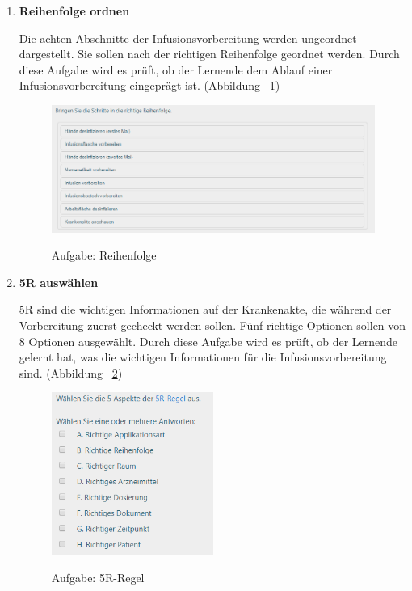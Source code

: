 \begin{enumerate}
    \item \textbf{Reihenfolge ordnen}
    
    Die achten Abschnitte der Infusionsvorbereitung werden ungeordnet dargestellt. Sie sollen nach der richtigen Reihenfolge geordnet werden. Durch diese Aufgabe wird es prüft, ob der Lernende dem Ablauf einer Infusionsvorbereitung eingeprägt ist. (Abbildung ~\ref{fig:Aufgabe1})
    
\begin{figure}[ht]
\vspace*{1em}
\centering
\caption{Aufgabe: Reihenfolge}
\includegraphics[width=\textwidth]{images/Aufgabe1.png}
\label{fig:Aufgabe1} 
\end{figure}
    
    
    \item \textbf{5R auswählen}
    
    5R sind die wichtigen Informationen auf der Krankenakte, die während der Vorbereitung zuerst gecheckt werden sollen. Fünf richtige Optionen sollen von 8 Optionen ausgewählt. Durch diese Aufgabe wird es prüft, ob der Lernende gelernt hat, was die wichtigen Informationen für die Infusionsvorbereitung sind. (Abbildung ~\ref{fig:Aufgabe2})
    
\begin{figure}[ht]
\vspace*{1em}
\centering
\caption{Aufgabe: 5R-Regel}
\includegraphics[width= 0.5\textwidth]{images/Aufgabe2.png}
\label{fig:Aufgabe2} 
\end{figure}
    

\end{enumerate}
